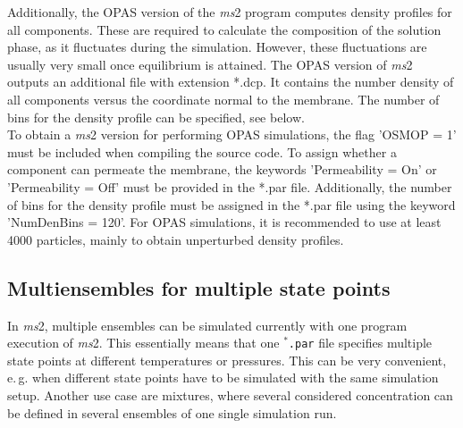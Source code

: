 Additionally, the OPAS version of the \emph{ms}2 program computes density profiles for all components. These are required to calculate the composition of the solution phase, as it fluctuates during the simulation. However, these fluctuations are usually very small once equilibrium is attained. The OPAS version of \emph{ms}2 outputs an additional file with extension *.dcp. It contains the number density of all components versus the coordinate normal to the membrane. The number of bins for the density profile can be specified, see below.\\
To obtain a \emph{ms}2 version for performing OPAS simulations, the flag 'OSMOP = 1' must be included when compiling the source code. To assign whether a component can permeate the membrane, the keywords 'Permeability = On' or 'Permeability = Off' must be provided in the *.par file. Additionally, the number of bins for the density profile must be assigned in the *.par file using the keyword 'NumDenBins = 120'. For OPAS simulations, it is recommended to use at least 4000 particles, mainly to obtain unperturbed density profiles.\\




%




\subsection{Multiensembles for multiple state points}
\label{sec:multiple Ensembles for multiple state points}


In \textit{ms}2, multiple ensembles can be simulated currently with one program execution of \textit{ms}2. This essentially means that one \texttt{$^{*}$\hspace{-3pt}.par} file specifies multiple state points at different temperatures or pressures. This can be very convenient, e.\,g. when different state points have to be simulated with the same simulation setup. Another use case are mixtures, where several considered concentration can be defined in several ensembles of one single simulation run. 

